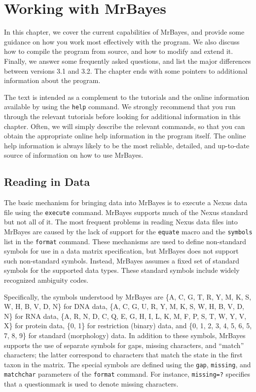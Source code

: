 \documentclass[12pt]{book}
\begin{document}
\chapter{Working with MrBayes}\label{advancedTopics}

In this chapter, we cover the current capabilities of MrBayes, and provide some guidance on how you
work most effectively with the program. We also discuss how to compile the program from source, and
how to modify and extend it. Finally, we answer some frequently asked questions, and list the major
differences between versions 3.1 and 3.2. The chapter ends with some pointers to additional
information about the program.

The text is intended as a complement to the tutorials and the online information available by using
the \texttt{help} command. We strongly recommend that you run through the relevant tutorials before
looking for additional information in this chapter. Often, we will simply describe the relevant
commands, so that you can obtain the appropriate online help information in the program itself. The
online help information is always likely to be the most reliable, detailed, and up-to-date source
of information on how to use MrBayes.

\section{Reading in Data}

The basic mechanism for bringing data into MrBayes is to execute a Nexus data file using the
\texttt{execute} command. MrBayes supports much of the Nexus standard \citep{Maddison97} but not
all of it. The most frequent problems in reading Nexus data files into MrBayes are caused by the
lack of support for the \texttt{equate} macro and the \texttt{symbols} list in the \texttt{format}
command. These mechanisms are used to define non-standard symbols for use in a data matrix
specification, but MrBayes does not support such non-standard symbols. Instead, MrBayes assumes a
fixed set of standard symbols for the supported data types. These standard symbols include widely
recognized ambiguity codes.

Specifically, the symbols understood by MrBayes are  \{A, C, G, T, R, Y, M, K, S, W, H, B, V, D,
N\} for DNA data, \{A, C, G, U, R, Y, M, K, S, W, H, B, V, D, N\} for RNA data, \{A, R, N, D, C, Q,
E, G, H, I, L, K, M, F, P, S, T, W, Y, V, X\} for protein data, \{0, 1\} for restriction (binary)
data, and \{0, 1, 2, 3, 4, 5, 6, 5, 7, 8, 9\} for standard (morphology) data. In addition to these
symbols, MrBayes supports the use of separate symbols for gaps, missing characters, and ``match''
characters; the latter correspond to characters that match the state in the first taxon in the
matrix. The special symbols are defined using the \texttt{gap}, \texttt{missing}, and
\texttt{matchchar} parameters of the \texttt{format} command. For instance, \texttt{missing=?}
specifies that a questionmark is used to denote missing characters.
\end{document}

